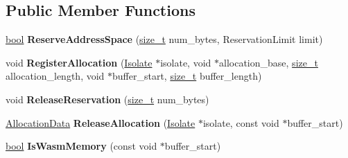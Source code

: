 \subsection*{Public Member Functions}
\begin{DoxyCompactItemize}
\item 
\mbox{\label{classv8_1_1internal_1_1wasm_1_1WasmMemoryTracker_aef0416889b1e9679d284ffd83fcc1e21}} 
\mbox{\hyperlink{classbool}{bool}} {\bfseries Reserve\+Address\+Space} (\mbox{\hyperlink{classsize__t}{size\+\_\+t}} num\+\_\+bytes, Reservation\+Limit limit)
\item 
\mbox{\label{classv8_1_1internal_1_1wasm_1_1WasmMemoryTracker_af991e4db1ec67809109724a9a70a4f7e}} 
void {\bfseries Register\+Allocation} (\mbox{\hyperlink{classv8_1_1internal_1_1Isolate}{Isolate}} $\ast$isolate, void $\ast$allocation\+\_\+base, \mbox{\hyperlink{classsize__t}{size\+\_\+t}} allocation\+\_\+length, void $\ast$buffer\+\_\+start, \mbox{\hyperlink{classsize__t}{size\+\_\+t}} buffer\+\_\+length)
\item 
\mbox{\label{classv8_1_1internal_1_1wasm_1_1WasmMemoryTracker_a57115f5d9bee51cce11d645ce13b95d2}} 
void {\bfseries Release\+Reservation} (\mbox{\hyperlink{classsize__t}{size\+\_\+t}} num\+\_\+bytes)
\item 
\mbox{\label{classv8_1_1internal_1_1wasm_1_1WasmMemoryTracker_af251edb3c8b528dc5f3bd776e8e134a7}} 
\mbox{\hyperlink{structv8_1_1internal_1_1wasm_1_1WasmMemoryTracker_1_1AllocationData}{Allocation\+Data}} {\bfseries Release\+Allocation} (\mbox{\hyperlink{classv8_1_1internal_1_1Isolate}{Isolate}} $\ast$isolate, const void $\ast$buffer\+\_\+start)
\item 
\mbox{\label{classv8_1_1internal_1_1wasm_1_1WasmMemoryTracker_ac8323ffef060fc3bac02b514493b57f2}} 
\mbox{\hyperlink{classbool}{bool}} {\bfseries Is\+Wasm\+Memory} (const void $\ast$buffer\+\_\+start)
\item 
\mbox{\label{classv8_1_1internal_1_1wasm_1_1WasmMemoryTracker_a92afb50bb68eeb9eb405421079b51601}} 

\end{DoxyCompactItemize}
